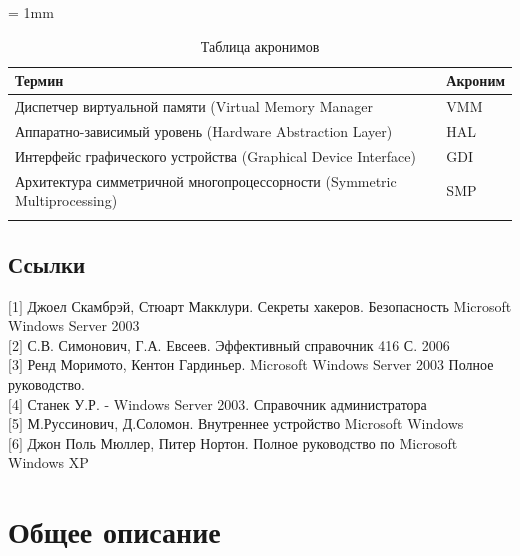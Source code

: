 \tabulinesep = 1mm
\begin{longtabu} to \textwidth {|X[6, m ] |X[2, l, m ] |}\firsthline\hline
\textbf{Термин}&\textbf{Акроним}\\ \hline \endfirsthead
Диспетчер виртуальной памяти (Virtual Memory Manager& VMM \\ \hline
Аппаратно-зависимый уровень (Hardware Abstraction Layer)& HAL \\ \hline
Интерфейс графического устройства (Graphical Device Interface) & GDI \\ \hline
Архитектура симметричной многопроцессорности (Symmetric Multiprocessing)& SMP \\ \hline
\caption{Таблица акронимов}
\end{longtabu}

\subsection{Ссылки}
$[$1$]$ Джоел Скамбрэй, Стюарт Макклури. Секреты хакеров. Безопасность Microsoft Windows Server 2003\\
$[$2$]$ С.В. Симонович, Г.А. Евсеев. Эффективный справочник 416 С. 2006\\
$[$3$]$ Ренд Моримото, Кентон Гардиньер. Microsoft Windows Server 2003 Полное руководство.\\
$[$4$]$ Станек У.Р. - Windows Server 2003. Справочник администратора\\
$[$5$]$ М.Руссинович, Д.Соломон. Внутреннее устройство Microsoft Windows\\
$[$6$]$ Джон Поль Мюллер, Питер Нортон. Полное руководство по Microsoft Windows XP


\section{Общее описание}
